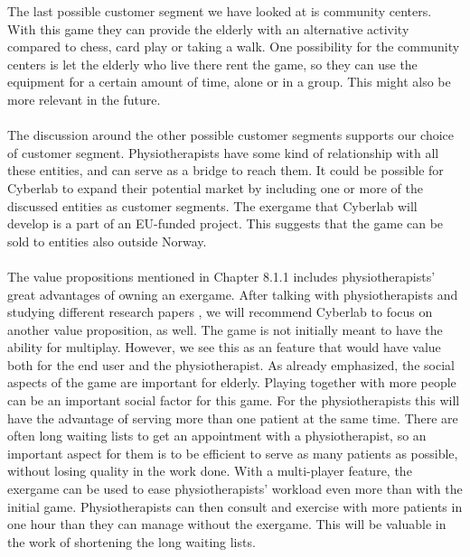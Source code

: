 The last possible customer segment we have looked at is community centers. With this game they can provide the elderly with an alternative activity compared to chess, card play or taking a walk. One possibility for the community centers is let the elderly who live there rent the game, so they can use the equipment for a certain amount of time, alone or in a group. This might also be more relevant in the future. \\ \\
The discussion around the other possible customer segments supports our choice of customer segment. Physiotherapists have some kind of relationship with all these entities, and can serve as a bridge to reach them. It could be possible for Cyberlab to expand their potential market by including one or more of the discussed entities as customer segments. The exergame that Cyberlab will develop is a part of an EU-funded project. This suggests that the game can be sold to entities also outside Norway.  \\ \\
The value propositions mentioned in Chapter 8.1.1 includes physiotherapists' great advantages of owning an exergame. After talking with physiotherapists and studying different research papers \cite{taylor2011activity} \cite{exergamesforelderly}, we will recommend Cyberlab to focus on another value proposition, as well. The game is not initially meant to have the ability for multiplay. However, we see this as an feature that would have value both for the end user and the physiotherapist. As already emphasized, the social aspects of the game are important for elderly. Playing together with more people can be an important social factor for this game. For the physiotherapists this will have the advantage of serving more than one patient at the same time. There are often long waiting lists to get an appointment with a physiotherapist, so an important aspect for them is to be efficient to serve as many patients as possible, without losing quality in the work done. With a multi-player feature, the exergame can be used to ease physiotherapists' workload even more than with the initial game. Physiotherapists can then consult and exercise with more patients in one hour than they can manage without the exergame. This will be valuable in the work of shortening the long waiting lists. \\ \\
